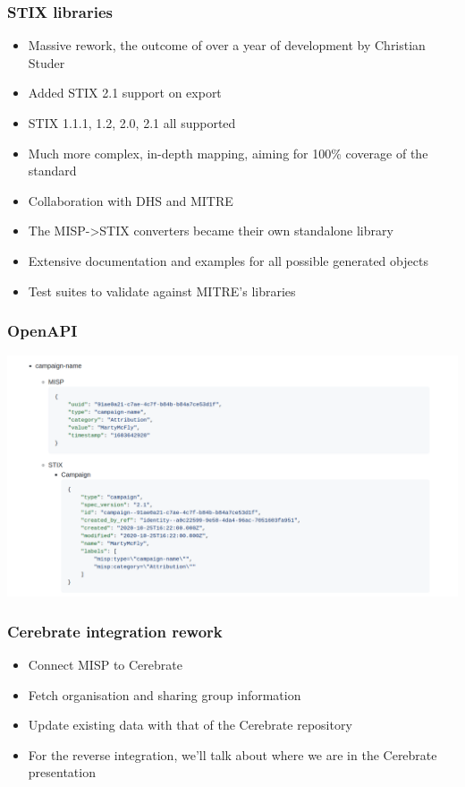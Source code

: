 \begin{frame}
  \frametitle{STIX libraries}
  \begin{itemize}
     \item Massive rework, the outcome of over a year of development by Christian Studer
     \item Added STIX 2.1 support on export
     \item STIX 1.1.1, 1.2, 2.0, 2.1 all supported
     \item Much more complex, in-depth mapping, aiming for 100\% coverage of the standard
     \item Collaboration with DHS and MITRE
     \item The MISP->STIX converters became their own standalone library
     \item Extensive documentation and examples for all possible generated objects
     \item Test suites to validate against MITRE's libraries
  \end{itemize}
\end{frame}

\begin{frame}
\frametitle{OpenAPI}
\includegraphics[scale=0.4]{images/stix.png}
\end{frame}

\begin{frame}
  \frametitle{Cerebrate integration rework}
  \begin{itemize}
     \item Connect MISP to Cerebrate
     \item Fetch organisation and sharing group information
     \item Update existing data with that of the Cerebrate repository
     \item For the reverse integration, we'll talk about where we are in the Cerebrate presentation
  \end{itemize}
\end{frame}

